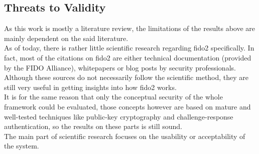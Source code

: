 \subsection{Threats to Validity}
\label{subsec:validity_threats}

As this work is mostly a literature review, the limitations of the results above are mainly dependent on the said literature.\\
As of today, there is rather little scientific research regarding \ac{fido2} specifically. In fact, most of the citations on \ac{fido2} are either technical documentation (provided by the FIDO Alliance), whitepapers or blog posts by security professionals. Although these sources do not necessarily follow the scientific method, they are still very useful in getting insights into how \ac{fido2} works.\\
It is for the same reason that only the conceptual security of the whole framework could be evaluated, those concepts however are based on mature and well-tested techniques like public-key cryptography and challenge-response authentication, so the results on these parts is still sound.\\
The main part of scientific research focuses on the usability or acceptability of the system.

